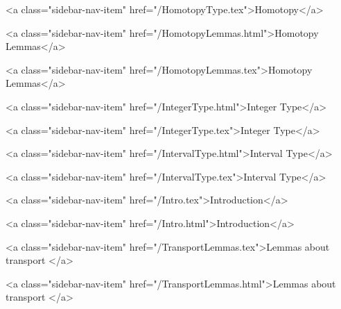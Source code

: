       
    
      
        
          <a class="sidebar-nav-item" href="/HomotopyType.tex">Homotopy</a>
        
      
    
      
        
          <a class="sidebar-nav-item" href="/HomotopyLemmas.html">Homotopy Lemmas</a>
        
      
    
      
        
          <a class="sidebar-nav-item" href="/HomotopyLemmas.tex">Homotopy Lemmas</a>
        
      
    
      
        
          <a class="sidebar-nav-item" href="/IntegerType.html">Integer Type</a>
        
      
    
      
        
          <a class="sidebar-nav-item" href="/IntegerType.tex">Integer Type</a>
        
      
    
      
        
          <a class="sidebar-nav-item" href="/IntervalType.html">Interval Type</a>
        
      
    
      
        
          <a class="sidebar-nav-item" href="/IntervalType.tex">Interval Type</a>
        
      
    
      
        
          <a class="sidebar-nav-item" href="/Intro.tex">Introduction</a>
        
      
    
      
        
          <a class="sidebar-nav-item" href="/Intro.html">Introduction</a>
        
      
    
      
        
          <a class="sidebar-nav-item" href="/TransportLemmas.tex">Lemmas about transport </a>
        
      
    
      
        
          <a class="sidebar-nav-item" href="/TransportLemmas.html">Lemmas about transport </a>
        
